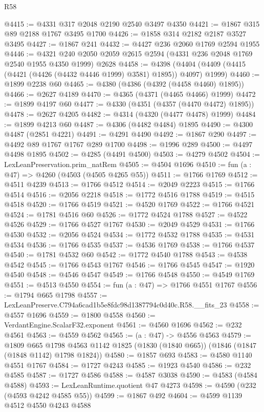 \begin{lexlean}{R58}
\begin{coremodule}
@4415 := @4331 @317 @2048 @2190 @2540 @3497 @4350
@4421 := @1867 @315 @89 @2188 @1767 @3495 @1700
@4426 := @1858 @314 @2182 @2187 @3527 @3495
@4427 := @1867 @241
@4432 := @4427 @236 @2060 @1769 @2594 @1955
@4446 := @4321 @240 @2050 @2059 @2615 @2594 (@4331 @236 @2048 @1769 @2540 @1955 @4350 @1999) @2628
@4458 := @4398 (@4404 (@4409 (@4415 (@4421 (@4426 (@4432 @4446 @1999) @3581) @1895)) @4097) @1999)
@4460 := @1899 @2238 @60
@4465 := @4380 (@4386 (@4392 (@4458 @4460) @1895))
@4466 := @2627 @4189
@4470 := @4365 (@4371 (@4465 @4466) @1999)
@4472 := @1899 @4197 @60
@4477 := @4330 (@4351 (@4357 (@4470 @4472) @1895))
@4478 := @2627 @4205
@4482 := @4314 (@4320 (@4477 @4478) @1999)
@4484 := @1899 @4213 @60
@4487 := @4306 (@4482 @4484) @1895
@4490 := @4300 @4487 (@2851 @4221)
@4491 := @4291 @4490
@4492 := @1867 @290
@4497 := @4492 @89 @1767 @1767 @289 @1700
@4498 := @1996 @289
@4500 := @4497 @4498 @1895
@4502 := @4285 (@4491 @4500)
@4503 := @4279 @4502
@4504 := LexLeanPreservation.prim_natRem
@4505 := @4504 @1696
@4510 := fun (a : @47) => @4260 (@4503 (@4505 @4265 @55))
@4511 := @1766 @1769
@4512 := @4511 @4239
@4513 := @1766 @4512
@4514 := @2049 @2223
@4515 := @1766 @4514
@4516 := @2056 @2218
@4518 := @1772 @4516 @1788
@4519 := @4515 @4518
@4520 := @1766 @4519
@4521 := @4520 @1769
@4522 := @1766 @4521
@4524 := @1781 @4516 @60
@4526 := @1772 @4524 @1788
@4527 := @4522 @4526
@4529 := @1766 @4527 @1767
@4530 := @2049 @4529
@4531 := @1766 @4530
@4532 := @2056 @4524
@4534 := @1772 @4532 @1788
@4535 := @4531 @4534
@4536 := @1766 @4535
@4537 := @4536 @1769
@4538 := @1766 @4537
@4540 := @1781 @4532 @60
@4542 := @1772 @4540 @1788
@4543 := @4538 @4542
@4545 := @1766 @4543 @1767
@4546 := @1766 @4545
@4547 := @1920 @4540
@4548 := @4546 @4547
@4549 := @1766 @4548
@4550 := @4549 @1769
@4551 := @4513 @4550
@4554 := fun (a : @47) => @1766 @4551 @1767
@4556 := @1794 @665 @1798
@4557 := LexLeanPreserve.C794a6cad1b5e8fdc98d1387794c0d40c.R58.__fits_23
@4558 := @4557 @1696
@4559 := @1800 @4558
@4560 := VerdantEngine.ScalarF32.exponent
@4561 := @4560 @1696
@4562 := @232 @4561
@4563 := @4559 @4562
@4565 := (a : @47) -> @4556 @4563
@4579 := @1809
    @665
    @1798
    @4563
    @1142
    @1825
    (@1830 (@1840 @665))
    (@1846 (@1847 (@1848 @1142) @1798 @1824))
@4580 := @1857 @693
@4583 := @4580 @1140 @4551 @1767
@4584 := @1727 @4243
@4585 := @1923 @4540
@4586 := @232 @4585
@4587 := @1727 @4586
@4588 := @4587 @3038
@4590 := @4583 (@4584 @4588)
@4593 := LexLeanRuntime.quotient @47 @4273
@4598 := @4590 (@232 (@4593 @4242 @4585 @55))
@4599 := @1867 @492
@4604 := @4599 @1139 @4512 @4550 @4243 @4588

\end{coremodule}
\end{lexlean}
